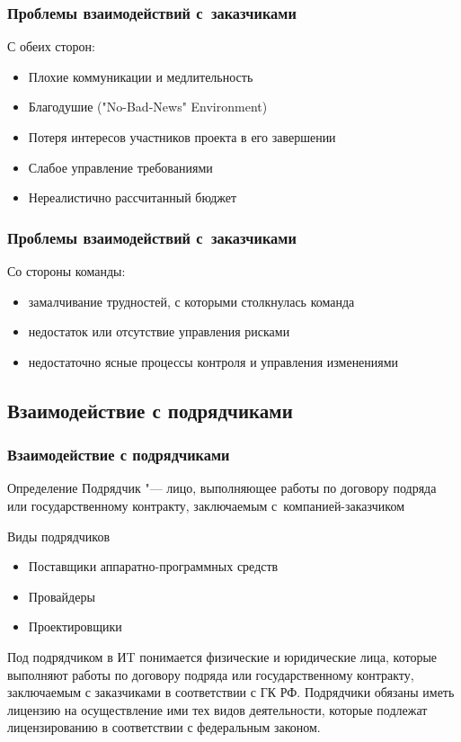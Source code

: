 \documentclass{../industrial-development}
\begin{document}
\begin{frame} \frametitle{Проблемы взаимодействий с~заказчиками}
	С обеих сторон:
	\begin{itemize}
		\item Плохие коммуникации и медлительность
		\item Благодушие ("No-Bad-News" Environment)
		\item Потеря интересов участников проекта в его завершении
		\item Слабое управление требованиями
		\item Нереалистично рассчитанный бюджет
	\end{itemize}
\end{frame}

\begin{frame} \frametitle{Проблемы взаимодействий с~заказчиками}
	Со стороны команды:
	\begin{itemize}
		\item замалчивание трудностей, с которыми столкнулась команда
		\item недостаток или отсутствие управления рисками
		\item недостаточно ясные процессы контроля и управления изменениями
	\end{itemize}
\end{frame}

\subsection{Взаимодействие с подрядчиками}
\begin{frame} \frametitle{Взаимодействие с подрядчиками}
	\begin{block}{Определение}
		\alert{Подрядчик} "--- лицо, выполняющее работы по договору подряда или государственному контракту, заключаемым с~компанией-заказчиком
	\end{block}

	\begin{block}{Виды подрядчиков}
		\begin{itemize}
			\item Поставщики аппаратно-программных средств
			\item Провайдеры
			\item Проектировщики
		\end{itemize}
	\end{block}
\end{frame}

\lecturenotes
Под подрядчиком в ИT понимается физические и юридические лица, которые выполняют работы по договору подряда или государственному контракту, заключаемым с заказчиками в соответствии с ГК РФ. Подрядчики обязаны иметь лицензию на осуществление ими тех видов деятельности, которые подлежат лицензированию в соответствии с федеральным законом.
\end{document}
